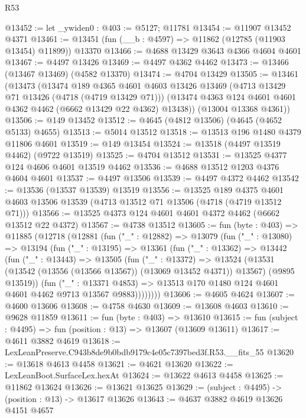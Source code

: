 \begin{lexlean}{R53}
\begin{coremodule}
@13452 := let _ywiden0 : @403 := @5127; @11781
@13454 := @11907 @13452 @4371
@13461 := @13451 (fun (__b : @4597) => @11862 (@12785 (@11903 @13454) @11899)) @13370
@13466 := @4688 @13429 @3643 @4366 @4604 @4601
@13467 := @4497 @13426
@13469 := @4497 @4362 @4462
@13473 := @13466 (@13467 @13469) (@4582 @13370)
@13474 := @4704 @13429
@13505 := @13461
    (@13473
      (@13474
        @189
        @4365
        @4601
        @4603
        @13426
        @13469
        (@4713 @13429 @71 @13426 (@4718 (@4719 @13429 @71)))
        (@13474 @4363 @124 @4601 @4601 @4362 @4462 (@6662 @13429 @22 @4362) @13438))
      (@13004 @13368 @4361))
@13506 := @149 @13452
@13512 := @4645 (@4812 @13506) (@4645 (@4652 @5133) @4655)
@13513 := @5014 @13512
@13518 := @13513 @196 @1480 @4379 @11806 @4601
@13519 := @149 @13454
@13524 := @13518 (@4497 @13519 @4462) (@9722 @13519)
@13525 := @4704 @13512
@13531 := @13525 @4377 @124 @4606 @4601 @13519 @4462
@13536 := @4688 @13512 @1203 @4376 @4604 @4601
@13537 := @4497 @13506
@13539 := @4497 @4372 @4462
@13542 := @13536 (@13537 @13539) @13519
@13556 := @13525
    @189
    @4375
    @4601
    @4603
    @13506
    @13539
    (@4713 @13512 @71 @13506 (@4718 (@4719 @13512 @71)))
@13566 := @13525 @4373 @124 @4601 @4601 @4372 @4462 (@6662 @13512 @22 @4372)
@13567 := @4738 @13512
@13605 := fun (byte : @403) =>
  @11885
    (@12718
      (@12881
        (fun ("_" : @12882) =>
        @13079
          (fun ("_" : @13080) =>
          @13194
            (fun ("_" : @13195) =>
            @13361
              (fun ("_" : @13362) =>
              @13442
                (fun ("_" : @13443) =>
                @13505
                  (fun ("_" : @13372) =>
                  @13524
                    (@13531 (@13542 (@13556 (@13566 @13567)) (@13069 @13452 @4371)) @13567)
                    (@9895 @13519))
                  (fun ("_" : @13371 @4853) =>
                  @13513 @170 @1480 @124 @4601 @4601 @4462 @9713 @13567 @9883))))))))
@13606 := @4605 @4624
@13607 := @4600 @13606
@13608 := @4758 @4630
@13609 := @13608 @4603
@13610 := @9628 @11859
@13611 := fun (byte : @403) => @13610
@13615 := fun (subject : @4495) => fun (position : @13) => @13607 (@13609 @13611)
@13617 := @4611 @3882 @4619
@13618 := LexLeanPreserve.C943b8de9b0bdb9179c4e05c7397bed3f.R53.__fits_55
@13620 := @13618 @4613 @4458
@13621 := @4621 @13620
@13622 := LexLeanBoot.SurfaceLex.hexAt
@13624 := @13622 @4613 @4458
@13625 := @11862 @13624
@13626 := @13621 @13625
@13629 := (subject : @4495) -> (position : @13) -> @13617 @13626
@13643 := @4637
    @3882
    @4619
    @13626
    @4151
    @4657

\end{coremodule}
\end{lexlean}
